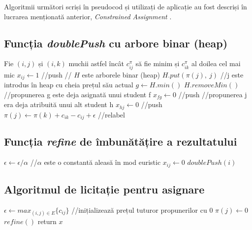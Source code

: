 Algoritmii următori scriși în pseudocod și utilizați de aplicație au fost descriși în lucrarea menționată anterior, \textit{Constrained Assignment} \cite{assignment}.

\subsection{Funcția \textit{doublePush} cu arbore binar (heap)}

\begin{algorithm}
	\caption{$doublePush(i)$}
	\begin{algorithmic}[1]
		\State Fie $(i, j)$ și $(i, k)$ muchii astfel încât $c_{ij}^\pi$ să fie minim și $c_{ik}^\pi$ al doilea cel mai mic
		\State $x_{ij} \gets 1$ //push 
		 // $H$ este arborele binar (heap)
			\State $H.put(\pi(j),\ j)$ //j este introdus în heap cu cheia prețul său actual
				\State $g \gets H.min()$
				\State $H.removeMin()$
				 //propunerea g este deja asignată unui student f
					\State $x_{fg} \gets 0$ //push
				\EndIf
			\EndIf
		\EndIf
		 //propunerea j era deja atribuită unui alt student h
			\State $x_{hj} \gets 0$ //push
		\EndIf
		\State $\pi(j) \gets \pi(k) + c_{ik} - c_{ij} + \epsilon$ //relabel
	\end{algorithmic}
\end{algorithm}

\subsection{Funcția \textit{refine} de îmbunătățire a rezultatului}

\begin{algorithm}
	\caption{$refine()$}
	\begin{algorithmic}[1]
		\State $\epsilon \gets \epsilon / \alpha$ //$\alpha$ este o constantă aleasă în mod euristic
			\State $x_{ij} \gets 0$
		\EndFor
			\State $doublePush(i)$
		\EndWhile
	\end{algorithmic}
\end{algorithm}

\subsection{Algoritmul de licitație pentru asignare}

\begin{algorithm}
	\caption{$solve()$}
	\begin{algorithmic}[1]
		\State $\epsilon \gets max_{(i, j) \in E}\{c_{ij}\}$
		 //inițializează prețul tuturor propunerilor cu 0
			\State $\pi(j) \gets 0$
		\EndFor
			\State $refine()$
		\EndWhile
		\State return $x$
	\end{algorithmic}
\end{algorithm}

